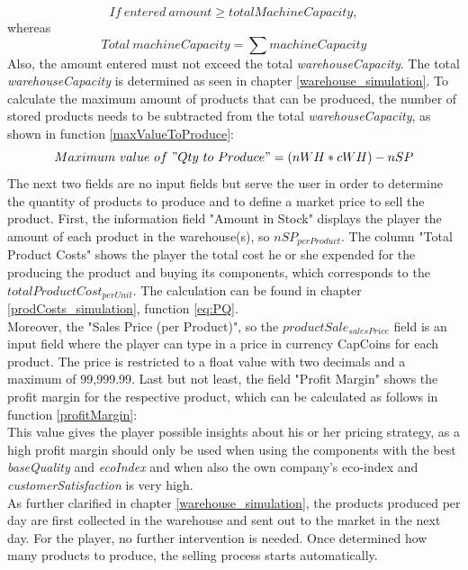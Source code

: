 \begin{equation}
\label{calc:machineryCapacity1}
   If~entered~amount \geqslant totalMachineCapacity, 
\end{equation}
whereas 
\begin{equation}
\label{calc:machineryCapacity2}
    Total~machineCapacity = \sum machineCapacity
\end{equation}
Also, the amount entered must not exceed the total \textit{warehouseCapacity}. The total \textit{warehouseCapacity} is determined as seen in chapter \ref{warehouse_simulation}. To calculate the maximum amount of products that can be produced, the number of stored products needs to be subtracted from the total \textit{warehouseCapacity}, as shown in function \ref{maxValueToProduce}:
\begin{equation}
\label{maxValueToProduce}
    Maximum~value~of~"Qty~to~Produce" = (nWH * cWH) - nSP
\end{equation}
The next two fields are no input fields but serve the user in order to determine the quantity of products to produce and to define a market price to sell the product. First, the information field "Amount in Stock" displays the player the amount of each product in the warehouse(s), so $nSP_{per Product}$. The column "Total Product Costs" shows the player the total cost he or she expended for the producing the product and buying its components, which corresponds to the \\
$totalProductCost_{perUnit}$. The calculation can be found in chapter \ref{prodCosts_simulation}, function \ref{eq:PQ}.\\
Moreover, the "Sales Price (per Product)", so the $productSale_{salesPrice}$ field is an input field where the player can type in a price in currency CapCoins for each product. The price is restricted to a float value with two decimals and a maximum of 99,999.99.
Last but not least, the field "Profit Margin" shows the profit margin for the respective product, which can be calculated as follows in function \ref{profitMargin}:
\begin{equation}
\label{profitMargin}
\end{equation}
This value gives the player possible insights about his or her pricing strategy, as a high profit margin should only be used when using the components with the best \textit{baseQuality} and \textit{ecoIndex} and when also the own company's eco-index and \textit{customerSatisfaction} is very high.\\
As further clarified in chapter \ref{warehouse_simulation}, the products produced per day are first collected in the warehouse and sent out to the market in the next day. For the player, no further intervention is needed. Once determined how many products to produce, the selling process starts automatically.

